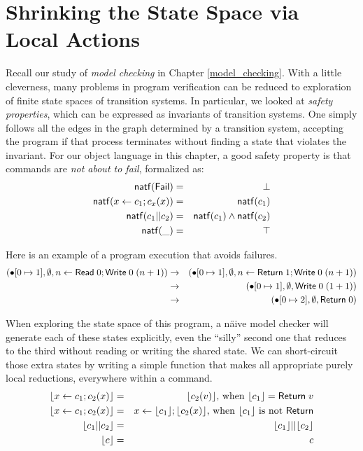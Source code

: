 \documentclass{amsbook}
\theoremstyle{definition}
\theoremstyle{remark}
\numberwithin{section}{chapter}
\numberwithin{equation}{chapter}
\begin{document}
\section{Shrinking the State Space via Local Actions}

\newcommand{\natf}[1]{\mt{natf}(#1)}

Recall our study of \emph{model checking} in Chapter \ref{model_checking}.
With a little cleverness, many problems in program verification can be reduced to exploration of finite state spaces of transition systems.
In particular, we looked at \emph{safety properties}, which can be expressed as invariants of transition systems.
One simply follows all the edges in the graph determined by a transition system, accepting the program if that process terminates without finding a state that violates the invariant.
For our object language in this chapter, a good safety property is that commands are \emph{not about to fail}, formalized as:
\begin{eqnarray*}
  \natf{\mt{Fail}} &=& \bot \\
  \natf{x \leftarrow c_1; c_x(x)} &=& \natf{c_1} \\
  \natf{c_1 || c_2} &=& \natf{c_1} \land \natf{c_2} \\
  \natf{\_} &=& \top
\end{eqnarray*}

Here is an example of a program execution that avoids failures.
\begin{eqnarray*}
  (\bullet[0 \mapsto 1], \emptyset, n \leftarrow \mathsf{Read} \; 0; \mathsf{Write} \; 0 \; (n+1))
  &\rightarrow& (\bullet[0 \mapsto 1], \emptyset, n \leftarrow \mathsf{Return} \; 1; \mathsf{Write} \; 0 \; (n+1)) \\
  &\rightarrow& (\bullet[0 \mapsto 1], \emptyset, \mathsf{Write} \; 0 \; (1+1)) \\
  &\rightarrow& (\bullet[0 \mapsto 2], \emptyset, \mathsf{Return} \; 0)
\end{eqnarray*}

\newcommand{\rl}[1]{{\left \lfloor #1 \right \rfloor}}

When exploring the state space of this program, a n\"aive model checker will generate each of these states explicitly, even the ``silly'' second one that reduces to the third without reading or writing the shared state.
We can short-circuit those extra states by writing a simple function that makes all appropriate purely local reductions, everywhere within a command.
\begin{eqnarray*}
  \rl{x \leftarrow c_1; c_2(x)} &=& \rl{c_2(v)}\textrm{, when $\rl{c_1} = \mt{Return} \; v$} \\
  \rl{x \leftarrow c_1; c_2(x)} &=& x \leftarrow \rl{c_1}; \rl{c_2(x)}\textrm{, when $\rl{c_1}$ is not $\mt{Return}$} \\
  \rl{c_1 || c_2} &=& \rl{c_1} || \rl{c_2} \\
  \rl{c} &=& c
\end{eqnarray*}
\end{document}
